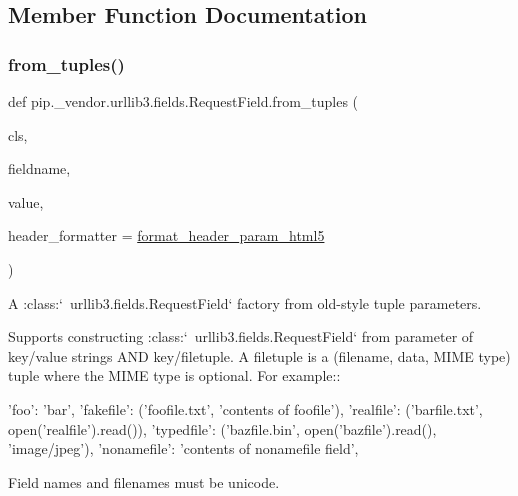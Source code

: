 \subsection{Member Function Documentation}
\mbox{\label{classpip_1_1__vendor_1_1urllib3_1_1fields_1_1RequestField_a8ffd57529618e1541b63ad3743feec13}} 
\subsubsection{\texorpdfstring{from\+\_\+tuples()}{from\_tuples()}}
{\footnotesize\ttfamily def pip.\+\_\+vendor.\+urllib3.\+fields.\+Request\+Field.\+from\+\_\+tuples (\begin{DoxyParamCaption}\item[{}]{cls,  }\item[{}]{fieldname,  }\item[{}]{value,  }\item[{}]{header\+\_\+formatter = {\ttfamily \hyperlink{namespacepip_1_1__vendor_1_1urllib3_1_1fields_a969066e8f71fd6c85bcfa7d6a81752a0}{format\+\_\+header\+\_\+param\+\_\+html5}} }\end{DoxyParamCaption})}

\begin{DoxyVerb}A :class:`~urllib3.fields.RequestField` factory from old-style tuple parameters.

Supports constructing :class:`~urllib3.fields.RequestField` from
parameter of key/value strings AND key/filetuple. A filetuple is a
(filename, data, MIME type) tuple where the MIME type is optional.
For example::

    'foo': 'bar',
    'fakefile': ('foofile.txt', 'contents of foofile'),
    'realfile': ('barfile.txt', open('realfile').read()),
    'typedfile': ('bazfile.bin', open('bazfile').read(), 'image/jpeg'),
    'nonamefile': 'contents of nonamefile field',

Field names and filenames must be unicode.
\end{DoxyVerb}
 \mbox{\label{classpip_1_1__vendor_1_1urllib3_1_1fields_1_1RequestField_a559f2c3dbfea2a1ee1e26240b8510d22}} 

